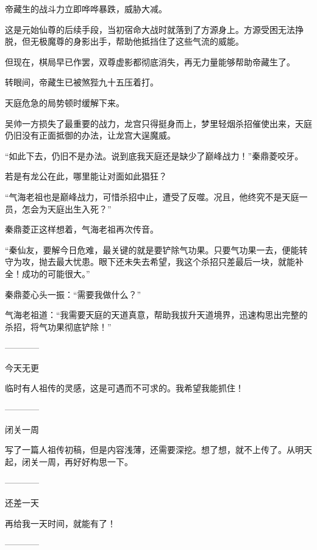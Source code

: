 \begin{this_body}
帝藏生的战斗力立即哗哗暴跌，威胁大减。

这是元始仙尊的后续手段，当初宿命大战时就落到了方源身上。方源受困无法挣脱，但无极魔尊的身影出手，帮助他抵挡住了这些气流的威能。

但现在，棋局早已作罢，双尊虚影都彻底消失，再无力量能够帮助帝藏生了。

转眼间，帝藏生已被煞狴九十五压着打。

天庭危急的局势顿时缓解下来。

吴帅一方损失了最重要的战力，龙宫只得挺身而上，梦里轻烟杀招催使出来，天庭仍旧没有正面抵御的办法，让龙宫大逞魔威。

“如此下去，仍旧不是办法。说到底我天庭还是缺少了巅峰战力！”秦鼎菱咬牙。

若是有龙公在此，哪里能让对面如此猖狂？

“气海老祖也是巅峰战力，可惜杀招中止，遭受了反噬。况且，他终究不是天庭一员，怎会为天庭出生入死？”

秦鼎菱正这样想着，气海老祖再次传音。

“秦仙友，要解今日危难，最关键的就是要铲除气功果。只要气功果一去，便能转守为攻，抛去最大忧患。眼下还未失去希望，我这个杀招只差最后一块，就能补全！成功的可能很大。”

秦鼎菱心头一振：“需要我做什么？”

气海老祖道：“我需要天庭的天道真意，帮助我拔升天道境界，迅速构思出完整的杀招，将气功果彻底铲除！”

------------

今天无更

临时有人祖传的灵感，这是可遇而不可求的。我希望我能抓住！

------------

闭关一周

写了一篇人祖传初稿，但是内容浅薄，还需要深挖。想了想，就不上传了。从明天起，闭关一周，再好好构思一下。

------------

还差一天

再给我一天时间，就能有了！

------------

\end{this_body}

